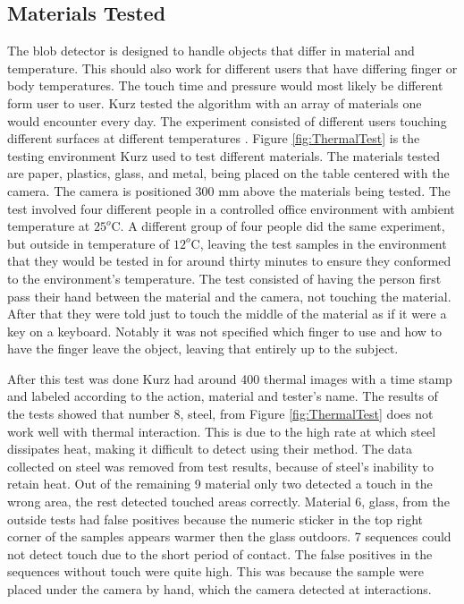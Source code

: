 \documentclass{sig-alternate}
\begin{document}
\subsection{Materials Tested}
\label{Materials Tested}
The blob detector is designed to handle objects that differ in material and temperature. This should also work for different users that have differing finger or body temperatures. The touch time and pressure would most likely be different form user to user. Kurz tested the algorithm with an array of materials one would encounter every day. The experiment consisted of different users touching different surfaces at different temperatures \cite{3D}. Figure \ref{fig:ThermalTest} is the testing environment Kurz used to test different materials. The materials tested are paper, plastics, glass, and metal, being placed on the table centered with the camera. The camera is positioned 300 mm above the materials being tested. The test involved four different people in a controlled office environment with ambient temperature at \(25^o\)C. A different group of four people did the same experiment, but outside in temperature of \(12^o\)C, leaving the test samples in the environment that they would be tested in for around thirty minutes to ensure they conformed to the environment's temperature. The test consisted of having the person first pass their hand between the material and the camera, not touching the material. After that they were told just to touch the middle of the material as if it were a key on a keyboard. Notably it was not specified which finger to use and how to have the finger leave the object, leaving that entirely up to the subject. 

After this test was done Kurz had around 400 thermal images with a time stamp and labeled according to the action, material and tester's name. The results of the tests showed that number 8, steel, from Figure \ref{fig:ThermalTest} does not work well with thermal interaction. This is due to the high rate at which steel dissipates heat, making it difficult to detect using their method. The data collected on steel was removed from test results, because of steel's inability to retain heat. Out of the remaining 9 material only two detected a touch in the wrong area, the rest detected touched areas correctly. Material 6, glass, from the outside tests had false positives because the numeric sticker in the top right corner of the samples appears warmer then the glass outdoors. 7 sequences could not detect touch due to the short period of contact. The false positives in the sequences without touch were quite high. This was because the sample were placed under the camera by hand, which the camera detected at interactions. 
\end{document}
